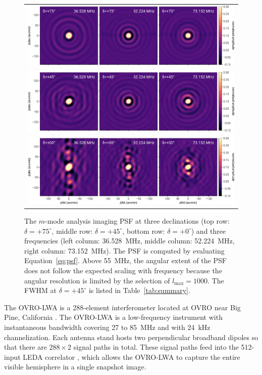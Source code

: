 \begin{bibunit}
\begin{figure}[t]
    \begin{tabular}{c}
        \includegraphics[width=\textwidth]{figures/chapter3/psf+75} \\
        \includegraphics[width=\textwidth]{figures/chapter3/psf+45} \\
        \includegraphics[width=\textwidth]{figures/chapter3/psf+0} \\
    \end{tabular}
    \caption{
        The $m$-mode analysis imaging PSF at three declinations (top row: $\delta=+75^\circ$, middle
        row: $\delta=+45^\circ$, bottom row: $\delta=+0^\circ$) and three frequencies (left column:
        36.528~MHz, middle column: 52.224~MHz, right column: 73.152~MHz).  The PSF is computed by
        evaluating Equation~\ref{eq:psf}. Above 55~MHz, the angular extent of the PSF does not
        follow the expected scaling with frequency because the angular resolution is limited by the
        selection of $l_\text{max}=1000$. The FWHM at $\delta=+45^\circ$ is listed in
        Table~\ref{tab:summary}.
    }
    \label{fig:psf}
\end{figure}

The OVRO-LWA is a 288-element interferometer located at OVRO near Big Pine, California
\citep{hallinan_2017}.  The OVRO-LWA is a low-frequency instrument with instantaneous bandwidth
covering 27 to 85~MHz and with 24~kHz channelization.  Each antenna stand hosts two perpendicular
broadband dipoles so that there are $288\times2$ signal paths in total. These signal paths feed into
the 512-input LEDA correlator \citep{2015JAI.....450003K}, which allows the OVRO-LWA to capture the
entire visible hemisphere in a single snapshot image.


\end{bibunit}
